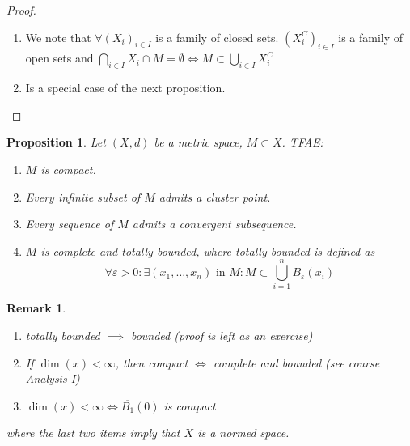 \documentclass[a4paper]{article}
\newcounter{lecref}[section]
\numberwithin{lecref}{section}
\newtheorem*{Remark}{Remark}
\newtheorem{proposition}[lecref]{Proposition}
\begin{document}
\begin{proof}
	\begin{enumerate}
		\item We note that $\forall (X_i)_{i \in I}$ is a family of closed sets.
			$(X_i^C)_{i \in I}$ is a family of open sets and $\bigcap_{i \in I} X_i \cap M = \emptyset \iff M \subset \bigcup_{i \in I} X_i^C$
		\item Is a special case of the next proposition.
	\end{enumerate}
\end{proof}

\begin{proposition}
	\label{proposition:1.19}
	Let $(X, d)$ be a metric space, $M \subset X$. TFAE:
	\begin{enumerate}
		\item $M$ is compact.
		\item Every infinite subset of $M$ admits a cluster point.
		\item Every sequence of $M$ admits a convergent subsequence.
		\item $M$ is complete and totally bounded, where totally bounded is defined as
			\[ \forall \varepsilon > 0: \exists (x_1, \dots, x_n) \text{ in } M: M \subset \bigcup_{i=1}^n B_\varepsilon(x_i) \]
	\end{enumerate}
\end{proposition}

\begin{Remark}
	\begin{enumerate}
		\item totally bounded $\implies$ bounded (proof is left as an exercise)
		\item If $\dim(x) < \infty$, then compact $\iff$ complete and bounded (see course Analysis I)
		\item $\dim(x) < \infty \iff \overline{B_1}(0)$ is compact
	\end{enumerate}
	where the last two items imply that $X$ is a normed space.
\end{Remark}
\end{document}
